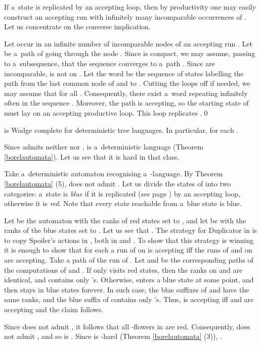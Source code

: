 \documentclass{LMCS}
\begin{document}
\proof If a~state  is replicated by an accepting loop, then by productivity one may easily construct an accepting run with infinitely many incomparable  occurrences of . Let us concentrate on the converse implication. 

Let  occur in an infinite number of incomparable nodes  of an accepting run . Let  be a~path of  going through the node . Since  is compact, we may assume, passing to a~subsequence, that the sequence  converges to a~path . Since  are incomparable,  is not on . Let the word  be the sequence of states labelling the path from the last common node of  and  to . Cutting the loops off if needed, we may assume that  for all . Consequently, there exist a~word  repeating infinitely often in the sequence . Moreover, the path  is accepting, so the starting state of  must lay on an accepting productive loop. This loop replicates .\qed


\begin{thm} \label{hardcore}
 is Wadge complete for deterministic  tree languages. In particular,  for each .
\end{thm}

\proof Since  admits neither  nor ,  is a~deterministic  language (Theorem \ref{borelautomata}). Let us see that it is hard in that class. 

Take a~deterministic automaton  recognising a~-language.  By Theorem \ref{borelautomata} (5),   does not admit .  Let us divide the states of  into two categories: a~state is {\em blue} if it is replicated (see page \pageref{replicated}) by an accepting loop, otherwise it is {\em red}. Note that every state reachable from a~blue state is blue.

Let  be the automaton  with the ranks of red states set to , and let  be  with the ranks of the blue states set to . Let us see that  . The strategy for Duplicator in  is to copy Spoiler's actions in , both in  and . To show that this strategy is winning it is enough to show that for each  a run of  on  is accepting iff  the runs of  and  on  are accepting. Take a path  of the run of . Let  and  be the corresponding paths of the computations of  and . If  only visits red states, then the ranks on  and  are identical, and  contains only 's. Otherwise,  enters a blue state at some point, and then stays in blue states forever. In such case, the blue suffixes of  and  have the same ranks, and the blue suffix of  contains only 's. Thus,  is accepting iff  and  are accepting and the claim follows. 

Since  does not admit , it follows that all -flowers in  are red. Consequently,  does not admit , and so  is . Since   is -hard (Theorem \ref{borelautomata} (3)), .
\end{document}
